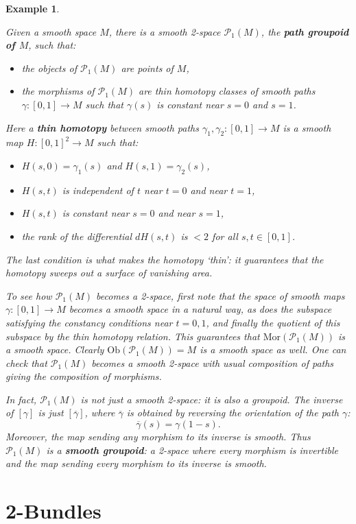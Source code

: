 \documentclass{article}
\newcommand{\maps}{\colon}
\newcommand{\Ob}{\mathrm{Ob}}
\newcommand{\Mor}{\mathrm{Mor}}
\renewcommand{\P}{\mathcal{P}}
\newtheorem{example}[theorem]{Example}
\newcommand{\et}{\hspace{-0.08in}{\bf .}\hspace{0.1in}}
\begin{document}
\begin{example} \et \label{2space.3}
{\rm 
Given a smooth space $M$, there is a smooth 2-space $\P_1(M)$,
the {\bf path groupoid of $M$}, such that:
\begin{itemize}
\item the objects of $\P_1(M)$ are points of $M$,
\item the morphisms of $\P_1(M)$ are thin homotopy classes of smooth paths
$\gamma \maps [0,1] \to M$ such that $\gamma(s)$ is constant near $s = 0$
and $s = 1$.
\end{itemize}
Here a {\bf thin homotopy} between smooth paths $\gamma_1, \gamma_2
\maps [0,1] \to M$ is a smooth map $H \maps [0,1]^2 \to M$ such that:
\begin{itemize}
\item 
$H(s,0) = \gamma_1(s)$ and 
$H(s,1) = \gamma_2(s)$, 
\item
$H(s,t)$ is independent of $t$ near $t = 0$ and near $t = 1$, 
\item
$H(s,t)$ is constant near $s = 0$ and near $s = 1$,
\item
the rank of the differential $dH(s,t)$ is $< 2$ for all $s,t \in
[0,1]$. 
\end{itemize}
The last condition is what makes the homotopy `thin': it guarantees
that the homotopy sweeps out a surface of vanishing area.  

To see how $\P_1(M)$ becomes a 2-space, first note that
the space of smooth maps $\gamma \maps [0,1] \to M$ becomes a
smooth space in a natural way, as does the subspace satisfying
the constancy conditions near $t = 0,1$, and finally the quotient
of this subspace by the thin homotopy relation.  
This guarantees that $\Mor(\P_1(M))$ is a smooth space.  Clearly
$\Ob(\P_1(M)) = M$ is a smooth space as well.  One can check that
$\P_1(M)$ becomes a smooth 2-space with usual composition of paths
giving the composition of morphisms.

In fact, $\P_1(M)$ is not just a smooth 2-space: it is also a groupoid.
The inverse of $[\gamma]$ is just $[\overline{\gamma}]$, 
where $\overline{\gamma}$ is obtained by reversing the orientation 
of the path $\gamma$:
\[        \overline{\gamma}(s) = \gamma(1 - s)  .\]
Moreover, the map sending any morphism to its inverse is 
smooth.  Thus $\P_1(M)$ is a {\bf smooth groupoid}: a 2-space
where every morphism is invertible and the map sending every morphism
to its inverse is smooth.  
}\end{example}  

\section{2-Bundles}
\label{section: 2-Bundles}
\end{document}
